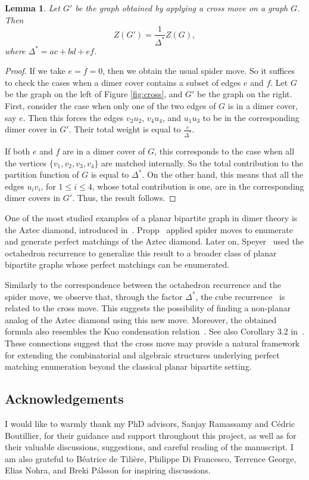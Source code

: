 \documentclass[12pt,a4paper]{article}
\newtheorem{lem}[thm]{Lemma}
\theoremstyle{definition}
\begin{document}
\begin{lem}
    Let $G'$ be the graph obtained by applying a cross move on a graph $G$. Then 
    \[Z(G') = \frac{1}{\Delta^*} Z(G),\]
    where $\Delta^* = ac + bd + ef$.
\end{lem}

\begin{proof}
    If we take $e = f = 0$, then we obtain the usual spider move. So it suffices to check the cases when a dimer cover contains a subset of edges $e$ and $f$. Let $G$ be the graph on the left of Figure \ref{fig:cross}, and $G'$ be the graph on the right. First, consider the case when only one of the two edges of $G$ is in a dimer cover, say $e$. Then this forces the edges $v_2u_2$, $v_4u_4$, and $u_1u_3$ to be in the corresponding dimer cover in $G'$. Their total weight is equal to $\frac{e}{\Delta^*}$.
    
    If both $e$ and $f$ are in a dimer cover of $G$, this corresponds to the case when all the vertices $\{v_1, v_2, v_3, v_4\}$ are matched internally. So the total contribution to the partition function of $G$ is equal to $\Delta^*$. On the other hand, this means that all the edges $u_iv_i$, for $1 \leq i \leq 4$, whose total contribution is one, are in the corresponding dimer covers in $G'$. Thus, the result follows.
\end{proof}

One of the most studied examples of a planar bipartite graph in dimer theory is the Aztec diamond, introduced in~\cite{ElkKupLarPropp}. Propp~\cite{Propp03} applied spider moves to enumerate and generate perfect matchings of the Aztec diamond. Later on, Speyer~\cite{Speyer07} used the octahedron recurrence to generalize this result to a broader class of planar bipartite graphs whose perfect matchings can be enumerated.

Similarly to the correspondence between the octahedron recurrence and the spider move, we observe that, through the factor $\Delta^*$, the cube recurrence~\cite{CS04} is related to the cross move. This suggests the possibility of finding a non-planar analog of the Aztec diamond using this new move. Moreover, the obtained formula also resembles the Kuo condensation relation~\cite{Kuo}. See also Corollary 3.2 in~\cite{Sp16}. These connections suggest that the cross move may provide a natural framework for extending the combinatorial and algebraic structures underlying perfect matching enumeration beyond the classical planar bipartite setting.

\subsection*{Acknowledgements}

I would like to warmly thank my PhD advisors, Sanjay Ramassamy and Cédric Boutillier, for their guidance and support throughout this project, as well as for their valuable discussions, suggestions, and careful reading of the manuscript. I am also grateful to Béatrice de Tilière, Philippe Di Francesco, Terrence George, Elias Nohra, and Breki Pálsson for inspiring discussions.



\end{document}
